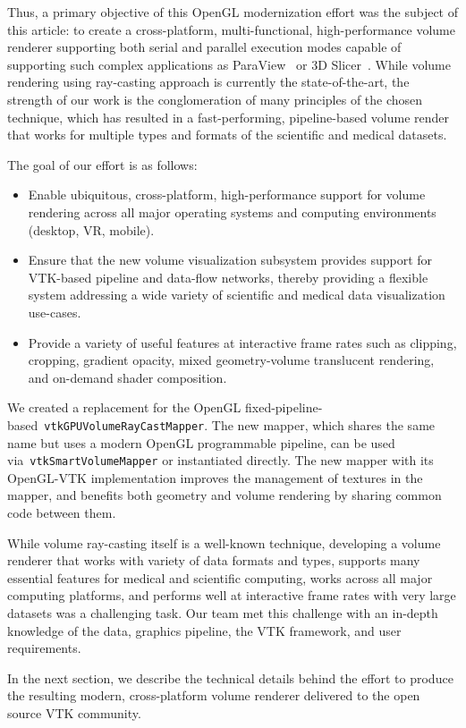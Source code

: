 Thus, a primary objective of this OpenGL modernization effort was the
subject of this article: to create a cross-platform, multi-functional,
high-performance volume renderer supporting both serial and parallel execution
modes capable of supporting such complex applications as
ParaView~\citep{ahrens_paraview:_2005,ayachit_paraview_2015} or 3D
Slicer~\citep{fedorov_3d_2012}.  While volume rendering using ray-casting
approach is currently the state-of-the-art, the strength of our work is the
conglomeration of many principles of the chosen technique, which has resulted in a
fast-performing, pipeline-based volume render that works for multiple types and
formats of the scientific and medical datasets. 

The goal of our effort is as follows:

\begin{itemize}
  \item Enable ubiquitous, cross-platform, high-performance support for volume
    rendering across all major operating systems and computing environments
    (desktop, VR, mobile).

  \item Ensure that the new volume visualization subsystem provides support for
    VTK-based pipeline and data-flow networks, thereby providing a flexible
    system addressing a wide variety of scientific and medical data
    visualization use-cases.

  \item Provide a variety of useful features at interactive frame rates such as
    clipping, cropping, gradient opacity, mixed geometry-volume translucent
    rendering, and on-demand shader composition.
\end{itemize}

We created a replacement for the OpenGL fixed-pipeline-based~\texttt{vtkGPUVolumeRayCastMapper}. The new mapper, which shares the same
name but uses a modern OpenGL programmable pipeline, can be used
via~\texttt{vtkSmartVolumeMapper} or instantiated directly. The
new mapper with its OpenGL-VTK implementation improves the management of
textures in the mapper, and benefits both geometry and volume rendering by sharing common code between them. 

While volume ray-casting itself is
a well-known technique, developing a volume renderer that works with variety of
data formats and types, supports many essential features for medical and
scientific computing, works across all major computing platforms, and performs
well at interactive frame rates with very large datasets was a challenging task. 
Our team met this challenge with an in-depth knowledge of the data, graphics pipeline, the VTK framework, and user requirements.  

In the next section, we describe the
technical details behind the effort to produce the resulting modern,
cross-platform volume renderer delivered to the open source VTK community.

